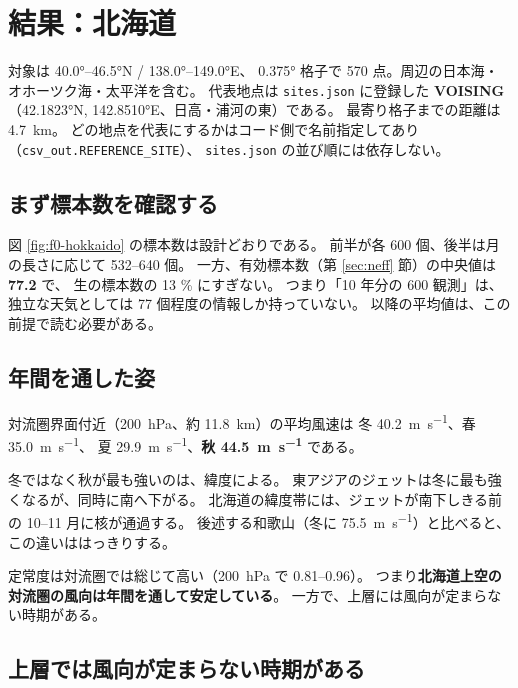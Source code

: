 \section{結果：北海道}
\label{sec:hokkaido}

対象は \ang{40.0}--\ang{46.5}N / \ang{138.0}--\ang{149.0}E、
\ang{0.375} 格子で 570 点。周辺の日本海・オホーツク海・太平洋を含む。
代表地点は \texttt{sites.json} に登録した \textbf{VOISING}
（\ang{42.1823}N, \ang{142.8510}E、日高・浦河の東）である。
最寄り格子までの距離は \SI{4.7}{\kilo\metre}。
どの地点を代表にするかはコード側で名前指定してあり
（\texttt{csv\_out.REFERENCE\_SITE}）、
\texttt{sites.json} の並び順には依存しない。

\subsection{まず標本数を確認する}



図 \ref{fig:f0-hokkaido} の標本数は設計どおりである。
前半が各 600 個、後半は月の長さに応じて 532--640 個。
一方、有効標本数（第 \ref{sec:neff} 節）の中央値は \textbf{77.2} で、
生の標本数の 13 \% にすぎない。
つまり「10 年分の 600 観測」は、独立な天気としては 77 個程度の情報しか持っていない。
以降の平均値は、この前提で読む必要がある。

\subsection{年間を通した姿}




対流圏界面付近（\SI{200}{\hecto\pascal}、約 \SI{11.8}{\kilo\metre}）の平均風速は
冬 \SI{40.2}{\metre\per\second}、春 \SI{35.0}{\metre\per\second}、
夏 \SI{29.9}{\metre\per\second}、\textbf{秋 \SI{44.5}{\metre\per\second}} である。

冬ではなく秋が最も強いのは、緯度による。
東アジアのジェットは冬に最も強くなるが、同時に南へ下がる。
北海道の緯度帯には、ジェットが南下しきる前の 10--11 月に核が通過する。
後述する和歌山（冬に \SI{75.5}{\metre\per\second}）と比べると、この違いははっきりする。

定常度は対流圏では総じて高い（\SI{200}{\hecto\pascal} で 0.81--0.96）。
つまり\textbf{北海道上空の対流圏の風向は年間を通して安定している}。
一方で、上層には風向が定まらない時期がある。

\subsection{上層では風向が定まらない時期がある}

